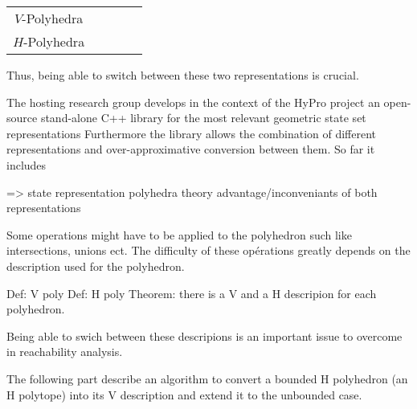 \begin{tabular}{| c || c | c | c | c |}
	\hline	
				    & & & & \\ \hline
	$V$-Polyhedra   & & & & \\ \hline
   	$H$-Polyhedra   & & & & \\ \hline
\end{tabular}

Thus, being able to switch between these two representations is crucial.

The hosting research group develops in the context of the HyPro project an open-source stand-alone C++ library for the most relevant geometric state set representations
Furthermore the library allows the combination of different representations and over-approximative conversion between them. So far it includes







=> state representation
polyhedra theory
advantage/inconveniants of both representations








Some operations might have to be applied to the polyhedron such like intersections, unions ect. The difficulty of these opérations greatly depends on the description used for the polyhedron.

Def: V poly
Def: H poly
Theorem: there is a V and a H descripion for each polyhedron.

Being able to swich between these descripions is an important issue to overcome in reachability analysis.

The following part describe an algorithm to convert a bounded H polyhedron (an H polytope) into its V description and extend it to the unbounded case.